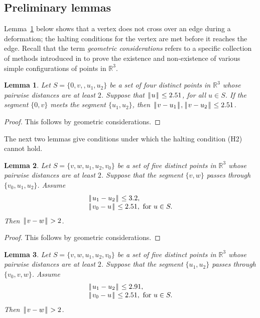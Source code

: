 \documentclass[11pt]{amsart}
\newcommand{\ring}[1]{\mathbb{#1}}
\def\text{\hbox}
\def\|{{\hskip0.1em|\hskip-0.15em|\hskip0.1em}}
\newtheorem{lemma}{Lemma}
\begin{document}
\subsection{Preliminary lemmas}\label{sec:pre}

Lemma~\ref{lemma:1} below shows that a vertex does not cross over an edge during a deformation; the halting conditions for the vertex are met before it reaches the edge.  Recall that the term {\it geometric considerations} refers to a specific collection of methods introduced in \cite[\S4.2]{Hales:2006:DCG} to prove the existence and non-existence of various simple configurations of points in $\ring{R}^3$.

\begin{lemma}\label{lemma:1} Let $S=\{0,v,,u_1,u_2\}$ be a set of four distinct points in $\ring{R}^3$ whose pairwise distances are at least $2$.  Suppose that $\|u\|\le 2.51$, for all $u\in S$.  If the segment $\{0,v\}$ meets the segment $\{u_1,u_2\}$, then $\|v-u_1\|,\|v-u_2\|\le 2.51$.
\end{lemma}

\begin{proof} This follows by geometric considerations.
\end{proof}

The next two lemmas give conditions under which the halting condition (H2) cannot hold.

\begin{lemma}\label{lemma:prelim}  Let $S=\{v,w,u_1,u_2,v_0\}$ be a set of five distinct points in $\ring{R}^3$ whose
pairwise distances are at least $2$. Suppose that the segment $\{v,w\}$ passes through
$\{v_0,u_1,u_2\}$. Assume
$$
\begin{array}{lll}
\|u_1-u_2\|\le 3.2,\\
\|v_0-u\|\le 2.51,\text{ for } u \in S.\\
\end{array}
$$
Then $\|v-w\|>2$.
\end{lemma}

\begin{proof} This follows by geometric considerations.
\end{proof}

\begin{lemma}\label{lemma:291}  Let $S=\{v,w,u_1,u_2,v_0\}$ be a set of five distinct points in $\ring{R}^3$ whose
pairwise distances are at least $2$. Suppose that the segment $\{u_1,u_2\}$ passes through
$\{v_0,v,w\}$. Assume
$$
\begin{array}{lll}
\|u_1-u_2\|\le 2.91,\\
\|v_0-u\|\le 2.51,\text{ for } u \in S.\\
\end{array}
$$
Then $\|v-w\|>2$.
\end{lemma}
\end{document}
